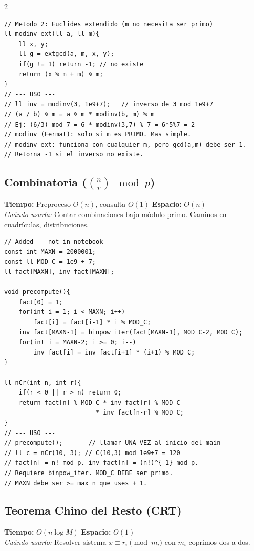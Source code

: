 \documentclass[10pt,a4paper]{article}
\begin{document}
\begin{multicols}{2}
\begin{lstlisting}
// Metodo 2: Euclides extendido (m no necesita ser primo)
ll modinv_ext(ll a, ll m){
    ll x, y;
    ll g = extgcd(a, m, x, y);
    if(g != 1) return -1; // no existe
    return (x % m + m) % m;
}
// --- USO ---
// ll inv = modinv(3, 1e9+7);   // inverso de 3 mod 1e9+7
// (a / b) % m = a % m * modinv(b, m) % m
// Ej: (6/3) mod 7 = 6 * modinv(3,7) % 7 = 6*5%7 = 2
// modinv (Fermat): solo si m es PRIMO. Mas simple.
// modinv_ext: funciona con cualquier m, pero gcd(a,m) debe ser 1.
// Retorna -1 si el inverso no existe.
\end{lstlisting}

\subsection{Combinatoria ($\binom{n}{r} \mod p$)}
\textbf{Tiempo:} Preproceso $O(n)$, consulta $O(1)$ \quad \textbf{Espacio:} $O(n)$\\
\textit{Cu\'ando usarla:} Contar combinaciones bajo m\'odulo primo. Caminos en cuadr\'iculas, distribuciones.

\begin{lstlisting}
// Added -- not in notebook
const int MAXN = 2000001;
const ll MOD_C = 1e9 + 7;
ll fact[MAXN], inv_fact[MAXN];

void precompute(){
    fact[0] = 1;
    for(int i = 1; i < MAXN; i++)
        fact[i] = fact[i-1] * i % MOD_C;
    inv_fact[MAXN-1] = binpow_iter(fact[MAXN-1], MOD_C-2, MOD_C);
    for(int i = MAXN-2; i >= 0; i--)
        inv_fact[i] = inv_fact[i+1] * (i+1) % MOD_C;
}

ll nCr(int n, int r){
    if(r < 0 || r > n) return 0;
    return fact[n] % MOD_C * inv_fact[r] % MOD_C
                         * inv_fact[n-r] % MOD_C;
}
// --- USO ---
// precompute();       // llamar UNA VEZ al inicio del main
// ll c = nCr(10, 3); // C(10,3) mod 1e9+7 = 120
// fact[n] = n! mod p. inv_fact[n] = (n!)^{-1} mod p.
// Requiere binpow_iter. MOD_C DEBE ser primo.
// MAXN debe ser >= max n que uses + 1.
\end{lstlisting}

\subsection{Teorema Chino del Resto (CRT)}
\textbf{Tiempo:} $O(n \log M)$ \quad \textbf{Espacio:} $O(1)$\\
\textit{Cu\'ando usarlo:} Resolver sistema $x \equiv r_i \pmod{m_i}$ con $m_i$ coprimos dos a dos.


\end{multicols}
\end{document}
